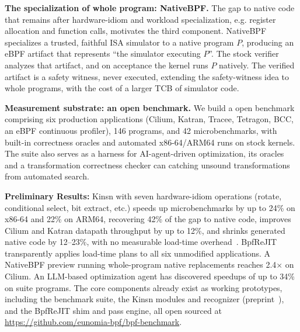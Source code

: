 \noindent\textbf{The specialization of whole program: NativeBPF.}  The gap to native code that remains after hardware-idiom and workload specialization, e.g. register allocation and function calls, motivates the third component. NativeBPF specializes a trusted, faithful ISA simulator to a native program $P$, producing an eBPF artifact that represents ``the simulator executing $P$''. The stock verifier analyzes that artifact, and on acceptance the kernel runs $P$ natively. The verified artifact is a safety witness, never executed, extending the safety-witness idea to whole programs, with the cost of a larger TCB of simulator code.

\noindent\textbf{Measurement substrate: an open benchmark.}  We build a open benchmark comprising six production applications (Cilium, Katran, Tracee, Tetragon, BCC, an eBPF continuous profiler), 146 programs, and 42 microbenchmarks, with built-in correctness oracles and automated x86-64/ARM64 runs on stock kernels. The suite also serves as a harness for AI-agent-driven optimization, its oracles and a transformation correctness checker can catching unsound transformations from automated search.

\noindent\textbf{Preliminary Results:} Kinsn with seven hardware-idiom operations (rotate, conditional select, bit extract, etc.) speeds up microbenchmarks by up to 24\% on x86-64 and 22\% on ARM64, recovering 42\% of the gap to native code, improves Cilium and Katran datapath throughput by up to 12\%, and shrinks generated native code by 12--23\%, with no measurable load-time overhead~\cite{zheng2026kinsn}.  BpfReJIT transparently applies load-time plans to all six unmodified applications.  A NativeBPF preview running whole-program native replacements reaches 2.4$\times$ on Cilium.  An LLM-based optimization agent has discovered speedups of up to 34\% on suite programs.  The core components already exist as working prototypes, including the benchmark suite, the Kinsn modules and recognizer (preprint~\cite{zheng2026kinsn}), and the BpfReJIT shim and pass engine, all open sourced at \url{https://github.com/eunomia-bpf/bpf-benchmark}.

